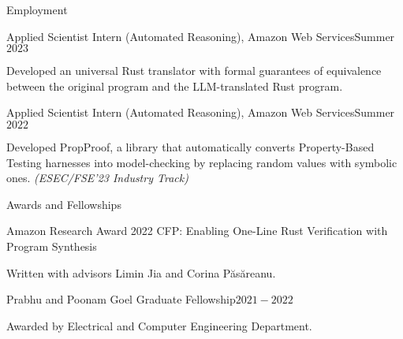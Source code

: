 \documentclass{resume} %
\begin{document}
\begin{rSection}{Employment}

  \begin{rSubsection}{Applied Scientist Intern (Automated Reasoning),
      Amazon Web Services}{Summer $2023$} {}{}
  \item Developed an universal Rust translator with formal guarantees
    of equivalence between the original program and the LLM-translated
    Rust program.
  \end{rSubsection}

  \begin{rSubsection}{Applied Scientist Intern (Automated Reasoning),
      Amazon Web Services}{Summer $2022$} {}{}
  \item Developed PropProof, a library that automatically converts
    Property-Based Testing harnesses into model-checking by replacing
    random values with symbolic ones. \textit{(ESEC/FSE'23 Industry Track)}
  \end{rSubsection}
\end{rSection}


\begin{rSection}{Awards and Fellowships}

  \begin{rSubsection}{Amazon Research Award 2022 CFP: Enabling One-Line Rust
      Verification with Program Synthesis}{}{}{}
  \item Written with advisors Limin Jia and Corina P\u{a}s\u{a}reanu.
  \end{rSubsection}

  \begin{rSubsection}{Prabhu and Poonam Goel Graduate Fellowship}{$2021 - 2022$}{}{}
    \item Awarded by Electrical and Computer Engineering Department.
  \end{rSubsection}
\end{rSection}
\end{document}
